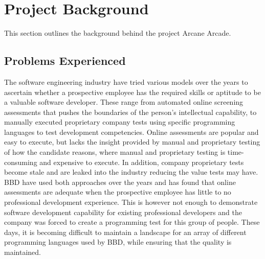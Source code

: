 \documentclass[english]{article}
\begin{document}
	\section{Project Background}
	This section outlines the background behind the project Arcane Arcade.
		\subsection{Problems Experienced}
		The software engineering industry have tried various models over the years to ascertain whether a prospective employee has the required skills or aptitude to be a valuable software developer. These range from automated online screening assessments that pushes the boundaries of the person's intellectual capability, to manually executed proprietary company tests using specific programming languages to test development competencies. Online assessments are popular and easy to execute, but lacks the insight provided by manual and proprietary testing of how the candidate reasons, where manual and proprietary testing is time-consuming and expensive to execute. In addition, company proprietary tests become stale and are leaked into the industry reducing the value tests may have.
		\\[12pt]
		BBD have used both approaches over the years and has found that online assessments are adequate when the prospective employee has little to no professional development experience. This is however not enough to demonstrate software development capability for existing professional developers and the company was forced to create a programming test for this group of people. These days, it is becoming difficult to maintain a landscape for an array of different programming languages used by BBD, while ensuring that the quality is maintained.

		\newpage
\end{document}
